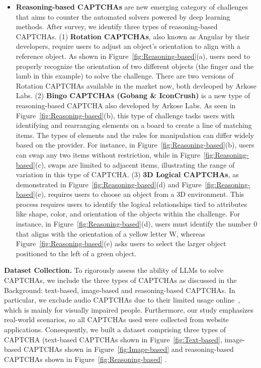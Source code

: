 \begin{itemize}[leftmargin=*]
    \item \textbf{Reasoning-based CAPTCHAs} 
    are new emerging category of challenges that aims to counter the automated solvers powered by deep learning methods. After survey, we identify three types of reasoning-based CAPTCHAs.
    (1) \textbf{Rotation CAPTCHAs}, also known as Angular by their developers, require users to adjust an object’s orientation to align with a reference object. 
    As shown in Figure~\ref{fig:Reasoning-based}(a), users need to properly recognize the orientation of two different objects (the finger and the lamb in this example) to solve the challenge. There are two versions of Rotation CAPTCHAs available in the market now, both devleoped by Arkose Labs. 
    (2) \textbf{Bingo CAPTCHAs (Gobang \& IconCrush)} is a new type of reasoning-based CAPTCHA also developed by Arkose Labs.
    As seen in Figure~\ref{fig:Reasoning-based}(b), this type of challenge tasks users with identifying and rearranging elements on a board to create a line of matching items. The types of elements and the rules for manipulation can differ widely based on the provider. For instance, in Figure~\ref{fig:Reasoning-based}(b), users can swap any two items without restriction, while in Figure~\ref{fig:Reasoning-based}(c), swaps are limited to adjacent items, illustrating the range of variation in this type of CAPTCHA.
    (3) \textbf{3D Logical CAPTCHAs}, as demonstrated in Figure~\ref{fig:Reasoning-based}(d) and Figure~\ref{fig:Reasoning-based}(e), requires users to choose an object from a 3D environment. This process requires users to identify the logical relationships tied to attributes like shape, color, and orientation of the objects within the challenge. For instance, in Figure~\ref{fig:Reasoning-based}(d), users must identify the number 0 that aligns with the orientation of a yellow letter W, whereas Figure~\ref{fig:Reasoning-based}(e) asks users to select the larger object positioned to the left of a green object.
    
\end{itemize}





\noindent\textbf{Dataset Collection.} To rigorously assess the ability of LLMs to solve CAPTCHAs, we include the three types of CAPTCHAs as discussed in the Background: text-based, image-based and reasoning-based CAPTCHAs. In particular, we exclude audio CAPTCHAs due to their limited usage online~\cite{fanelle2020blind}, which is mainly for visually impaired people. Furthermore, our study emphasizes real-world scenarios, so all CAPTCHAs used were collected from website applications. Consequently, we built a dataset comprising three types of CAPTCHA (text-based CAPTCHAs shown in Figure~\ref{fig:Text-based}, image-based CAPTCHAs shown in Figure~\ref{fig:Image-based} and reasoning-based CAPTCHAs shown in Figure~\ref{fig:Reasoning-based} .


